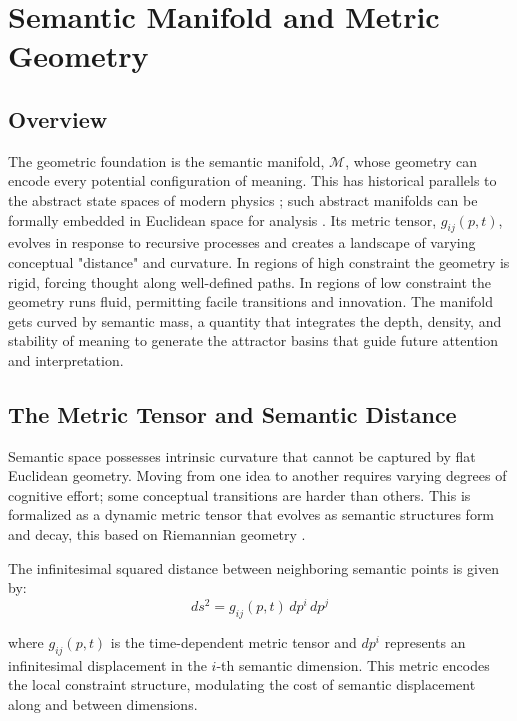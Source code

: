 \chapter{Semantic Manifold and Metric Geometry}

\section{Overview}

The geometric foundation is the semantic manifold, \(\mathcal{M}\), whose geometry can encode every potential configuration of meaning. This has historical parallels to the abstract state spaces of modern physics \autocite{vonNeumann1932}; such abstract manifolds can be formally embedded in Euclidean space for analysis \autocite{Whitney1936}. Its metric tensor, \(g_{ij}(p, t)\), evolves in response to recursive processes and creates a landscape of varying conceptual "distance" and curvature. In regions of high constraint the geometry is rigid, forcing thought along well-defined paths. In regions of low constraint the geometry runs fluid, permitting facile transitions and innovation. The manifold gets curved by semantic mass, a quantity that integrates the depth, density, and stability of meaning to generate the attractor basins that guide future attention and interpretation.

\section{The Metric Tensor and Semantic Distance}

Semantic space possesses intrinsic curvature that cannot be captured by flat Euclidean geometry. Moving from one idea to another requires varying degrees of cognitive effort; some conceptual transitions are harder than others. This is formalized as a dynamic metric tensor that evolves as semantic structures form and decay, this based on Riemannian geometry \autocite{Riemann1868, doCarmo1992, Lee2003}.

The infinitesimal squared distance between neighboring semantic points is given by:
\begin{equation}
ds^2 = g_{ij}(p, t) \, dp^i \, dp^j
\end{equation}

where \(g_{ij}(p, t)\) is the time-dependent metric tensor and \(dp^i\) represents an infinitesimal displacement in the \(i\)-th semantic dimension. This metric encodes the local constraint structure, modulating the cost of semantic displacement along and between dimensions.

